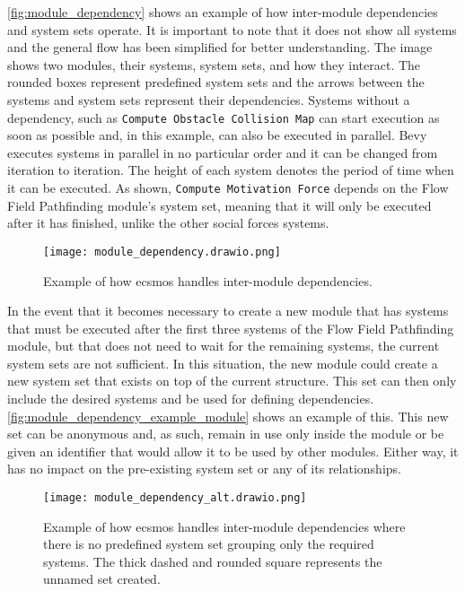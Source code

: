 \documentclass[twoside, 11pt]{article}
\begin{document}
\autoref{fig:module_dependency} shows an example of how inter-module dependencies and system sets operate. It is important to note that it does not show all systems and the general flow has been simplified for better understanding. The image shows two modules, their systems, system sets, and how they interact. The rounded boxes represent predefined system sets and the arrows between the systems and system sets represent their dependencies. Systems without a dependency, such as \verb|Compute Obstacle Collision Map| can start execution as soon as possible and, in this example, can also be executed in parallel. Bevy executes systems in parallel in no particular order and it can be changed from iteration to iteration. The height of each system denotes the period of time when it can be executed. As shown, \verb|Compute Motivation Force| depends on the Flow Field Pathfinding module's system set, meaning that it will only be executed after it has finished, unlike the other social forces systems.

\begin{figure}[h]
  \centering
  \texttt{[image: module\_dependency.drawio.png]}
  \caption[Example of how ECSMoS handles inter-module dependencies]{Example of how \gls{ecsmos} handles inter-module dependencies.}
  \label{fig:module_dependency}
\end{figure}

In the event that it becomes necessary to create a new module that has systems that must be executed after the first three systems of the Flow Field Pathfinding module, but that does not need to wait for the remaining systems, the current system sets are not sufficient. In this situation, the new module could create a new system set that exists on top of the current structure. This set can then only include the desired systems and be used for defining dependencies. 
\autoref{fig:module_dependency_example_module} shows an example of this. This new set can be anonymous and, as such, remain in use only inside the module or be given an identifier that would allow it to be used by other modules. Either way, it has no impact on the pre-existing system set or any of its relationships.

\begin{figure}[h]
  \centering
  \texttt{[image: module\_dependency\_alt.drawio.png]}
  \caption[Example of how ECSMoS handles the addition of systems with dependencies]{Example of how \gls{ecsmos} handles inter-module dependencies where there is no predefined system set grouping only the required systems. The thick dashed and rounded square represents the unnamed set created.}
  \label{fig:module_dependency_example_module}
\end{figure}
\end{document}
